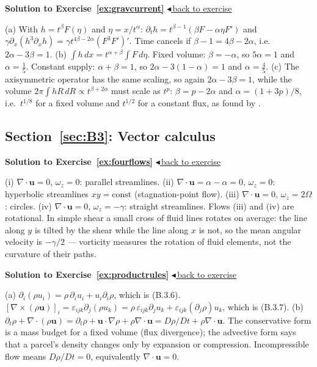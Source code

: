 \documentclass[11pt,letterpaper]{article}
\numberwithin{equation}{section}
\newcommand{\uu}{\mathbf{u}}
\newenvironment{solution}[1]{%
  \par\addvspace{1.0ex}\noindent\phantomsection\label{sol:#1}%
  {\color{exorange!85!black}\bfseries Solution to Exercise~\ref{ex:#1}}%
  \hfill\hyperref[ex:#1]{\small$\blacktriangleleft$\,back to exercise}\par\nopagebreak\smallskip}%
  {\par\smallskip\noindent{\color{exorange!40}\rule{\linewidth}{0.4pt}}\par}
\begin{document}
\begin{solution}{gravcurrent}
(a) With $h=t^\beta F(\eta)$ and $\eta=x/t^\alpha$: $\partial_th=t^{\beta-1}(\beta F-\alpha\eta F')$ and
$\gamma\partial_x(h^3\partial_xh)=\gamma t^{4\beta-2\alpha}(F^3F')'$. Time cancels if $\beta-1=4\beta-2\alpha$, i.e.\ $2\alpha-3\beta=1$.
(b) $\int h\,dx=t^{\alpha+\beta}\int F\,d\eta$. Fixed volume: $\beta=-\alpha$, so $5\alpha=1$ and $\alpha=\tfrac15$. Constant supply: $\alpha+\beta=1$, so
$2\alpha-3(1-\alpha)=1$ and $\alpha=\tfrac45$.
(c) The axisymmetric operator has the same scaling, so again $2\alpha-3\beta=1$, while the volume $2\pi\int hR\,dR\propto t^{\beta+2\alpha}$ must scale as
$t^p$: $\beta=p-2\alpha$ and $\alpha=(1+3p)/8$, i.e.\ $t^{1/8}$ for a fixed volume and $t^{1/2}$ for a constant flux, as found by \citet{huppert1982}.
\end{solution}

\subsection*{Section~\ref{sec:B3}: Vector calculus}

\begin{solution}{fourflows}
(i) $\nabla\cdot\uu=0$, $\omega_z=0$: parallel streamlines. (ii) $\nabla\cdot\uu=\alpha-\alpha=0$, $\omega_z=0$: hyperbolic streamlines $xy=\text{const}$
(stagnation-point flow). (iii) $\nabla\cdot\uu=0$, $\omega_z=2\Omega$: circles. (iv) $\nabla\cdot\uu=0$, $\omega_z=-\gamma$: straight streamlines. Flows (iii) and
(iv) are rotational. In simple shear a small cross of fluid lines rotates on average: the line along $y$ is tilted by the shear while the line along
$x$ is not, so the mean angular velocity is $-\gamma/2$ --- vorticity measures the rotation of fluid elements, not the curvature of their paths.
\end{solution}

\begin{solution}{productrules}
(a) $\partial_i(\rho u_i)=\rho\,\partial_iu_i+u_i\partial_i\rho$, which is (B.3.6). $[\nabla\times(\rho\uu)]_i=\varepsilon_{ijk}\partial_j(\rho u_k)=\rho\,\varepsilon_{ijk}\partial_ju_k+\varepsilon_{ijk}(\partial_j\rho)u_k$,
which is (B.3.7).
(b) $\partial_t\rho+\nabla\cdot(\rho\uu)=\partial_t\rho+\uu\cdot\nabla\rho+\rho\nabla\cdot\uu=D\rho/Dt+\rho\nabla\cdot\uu$. The conservative form is a mass budget for a fixed
volume (flux divergence); the advective form says that a parcel's density changes only by expansion or compression. Incompressible flow means
$D\rho/Dt=0$, equivalently $\nabla\cdot\uu=0$.
\end{solution}
\end{document}

